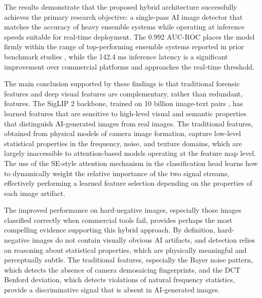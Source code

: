 The results demonstrate that the proposed hybrid architecture successfully achieves the primary research objective: a single-pass AI image detector that matches the accuracy of heavy ensemble systems while operating at inference speeds suitable for real-time deployment. The 0.992 AUC-ROC places the model firmly within the range of top-performing ensemble systems reported in prior benchmark studies \cite{perotti2025nodedetector, li2025aigibench}, while the 142.4 ms inference latency is a significant improvement over commercial platforms and approaches the real-time threshold.

The main conclusion supported by these findings is that traditional forensic features and deep visual features are complementary, rather than redundant, features. The SigLIP 2 backbone, trained on 10 billion image-text pairs \cite{tschannen2025siglip2}, has learned features that are sensitive to high-level visual and semantic properties that distinguish AI-generated images from real images. The traditional features, obtained from physical models of camera image formation, capture low-level statistical properties in the frequency, noise, and texture domains, which are largely inaccessible to attention-based models operating at the feature map level. The use of the SE-style attention mechanism in the classification head learns how to dynamically weight the relative importance of the two signal streams, effectively performing a learned feature selection depending on the properties of each image artifact.

The improved performance on hard-negative images, especially those images classified correctly when commercial tools fail, provides perhaps the most compelling evidence supporting this hybrid approach. By definition, hard-negative images do not contain visually obvious AI artifacts, and detection relies on reasoning about statistical properties, which are physically meaningful and perceptually subtle. The traditional features, especially the Bayer noise pattern, which detects the absence of camera demosaicing fingerprints, and the DCT Benford deviation, which detects violations of natural frequency statistics, provide a discriminative signal that is absent in AI-generated images.
